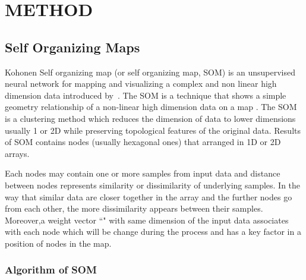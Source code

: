 
\section{METHOD}
\label{sec: method}
 \subsection{Self Organizing Maps}
 \label{sec: som}
 
 Kohonen Self organizing map (or self organizing map, SOM) is an unsupervised neural network for mapping and visualizing a complex and non linear high dimension data introduced by~\citep{Kohonen82}. 
 The SOM is a technique that shows a simple geometry relationship of a non-linear high dimension data on a map \citep{Kohonen98}.
 The SOM is a clustering method which reduces the dimension of data to lower dimensions usually 1 or 2D while preserving topological features of the original data.
 Results of SOM contains nodes (usually hexagonal ones) that arranged in 1D or 2D arrays.
 
  
 Each nodes may contain one or more samples from input data and distance between nodes represents similarity or dissimilarity of underlying samples. 
 In the way that similar data are closer together in the array and the further nodes go from each other, the more dissimilarity appears between their samples.
 Moreover,a weight vector ``" with same dimension of the input data associates with each node which will be change during the process and has a key factor in a position of nodes in the map. 
 
 \subsubsection{Algorithm of SOM} 
 \label{sec: algorithm}

